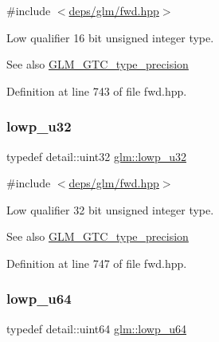 {\ttfamily \#include $<$\hyperlink{fwd_8hpp}{deps/glm/fwd.\+hpp}$>$}

Low qualifier 16 bit unsigned integer type. \begin{DoxySeeAlso}{See also}
\hyperlink{group__gtc__type__precision}{G\+L\+M\+\_\+\+G\+T\+C\+\_\+type\+\_\+precision} 
\end{DoxySeeAlso}


Definition at line 743 of file fwd.\+hpp.

\mbox{\label{group__gtc__type__precision_gaba06fae1dd98ca50c017e68345df0365}} 
\subsubsection{\texorpdfstring{lowp\+\_\+u32}{lowp\_u32}}
{\footnotesize\ttfamily typedef detail\+::uint32 \hyperlink{group__gtc__type__precision_gaba06fae1dd98ca50c017e68345df0365}{glm\+::lowp\+\_\+u32}}



{\ttfamily \#include $<$\hyperlink{fwd_8hpp}{deps/glm/fwd.\+hpp}$>$}

Low qualifier 32 bit unsigned integer type. \begin{DoxySeeAlso}{See also}
\hyperlink{group__gtc__type__precision}{G\+L\+M\+\_\+\+G\+T\+C\+\_\+type\+\_\+precision} 
\end{DoxySeeAlso}


Definition at line 747 of file fwd.\+hpp.

\mbox{\label{group__gtc__type__precision_ga61ed4c68a4cffb77cd63cc107119123a}} 
\subsubsection{\texorpdfstring{lowp\+\_\+u64}{lowp\_u64}}
{\footnotesize\ttfamily typedef detail\+::uint64 \hyperlink{group__gtc__type__precision_ga61ed4c68a4cffb77cd63cc107119123a}{glm\+::lowp\+\_\+u64}}




